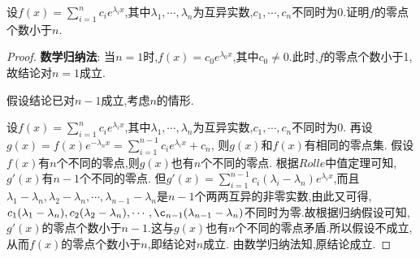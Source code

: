 \documentclass[lang=cn,newtx,10pt,scheme=chinese]{../Template/elegantbook}
\begin{document}
\begin{exercise}
    设\(f(x)=\sum_{i = 1}^{n}c_{i}e^{\lambda_{i}x}\),其中\(\lambda_1,\cdots,\lambda_n\)为互异实数,\(c_1,\cdots,c_n\)不同时为\(0\).证明\(f\)的零点个数小于\(n\).
    \end{exercise}
\begin{proof}
        \textbf{数学归纳法}:
        当$n=1$时,$f(x)=c_0e^{\lambda_0 x}$,其中$c_0\ne0$.此时,$f$的零点个数小于1,故结论对$n=1$成立.

        假设结论已对$n-1$成立,考虑$n$的情形.
        
        设$f(x)=\sum_{i=1}^{n} c_ie^{\lambda_ix}$,其中\(\lambda_1,\cdots,\lambda_n\)为互异实数,\(c_1,\cdots,c_n\)不同时为\(0\).
        再设$g(x)=f(x)e^{-\lambda_nx}=\sum_{i=1}^{n-1} c_ie^{\lambda_ix}+c_n$,
        则$g(x)$和$f(x)$有相同的零点集.
        假设$f(x)$有$n$个不同的零点,则$g(x)$也有$n$个不同的零点.
        根据$Rolle$中值定理可知,$g'(x)$有$n-1$个不同的零点.
        但$g'(x)=\sum_{i=1}^{n-1} c_i(\lambda_i-\lambda_n)e^{\lambda_ix}$,而且$\lambda_1-\lambda_n,\lambda_2-\lambda_n,\cdots,\lambda_{n-1}-\lambda_n$是$n-1$个两两互异的非零实数,由此又可得,$c_1(\lambda_1-\lambda_n),c_2(\lambda_2-\lambda_n),\cdots,\c_{n-1}(\lambda_{n-1}-\lambda_n)$不同时为零.故根据归纳假设可知,$g'(x)$的零点个数小于$n-1$.这与$g(x)$也有$n$个不同的零点矛盾.所以假设不成立,从而$f(x)$的零点个数小于$n$,即结论对$n$成立.
        由数学归纳法知,原结论成立.
\end{proof}
\end{document}
